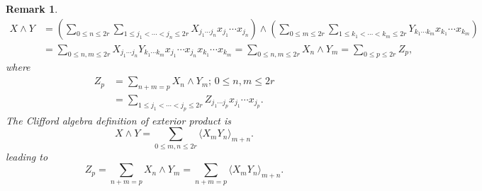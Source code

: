 \documentclass[aps, preprint]{revtex4}
\newtheorem{remark}[theorem]{Remark}
\begin{document}
\begin{remark}
\begin{align}X \wedge Y &  =\left (\sum _{0 \leq n \leq 2 r}\sum _{1 \leq j_{1} <\cdots  <j_{n} \leq 2 r}X_{j_{1} \cdots  j_{n}} x_{j_{1}} \cdots  x_{j_{n}}\right ) \wedge \left (\sum _{0 \leq m \leq 2 r}\sum _{1 \leq k_{1} <\cdots  <k_{m} \leq 2 r}Y_{k_{1} \cdots  k_{m}} x_{k_{1}} \cdots  x_{k_{m}}\right ) \\
 &  =\sum _{0 \leq n ,m \leq 2 r}X_{j_{1} \cdots  j_{n}} Y_{k_{1} \cdots  k_{m}} x_{j_{1}} \cdots  x_{j_{n}} x_{k_{1}} \cdots  x_{k_{m}} =\sum _{0 \leq n ,m \leq 2 r}X_{n} \wedge Y_{m} =\sum _{0 \leq p \leq 2 r}Z_{p}\text{,}\end{align}where
\begin{align}Z_{p} &  =\sum _{n +m =p}X_{n} \wedge Y_{m} ;\,0 \leq n ,m \leq 2 r \\
 &  =\sum _{1 \leq j_{1} <\cdots  <j_{p} \leq 2 r}Z_{j_{1} \cdots  j_{p}} x_{j_{1}} \cdots  x_{j_{p}}\text{.}\end{align}The Clifford algebra definition of exterior product is
\begin{equation}X \wedge Y =\sum _{0 \leq m ,n \leq 2 r} \langle X_{m} Y_{n} \rangle _{m +n}\text{.}
\end{equation}leading to
\begin{equation}Z_{p} =\sum _{n +m =p}X_{n} \wedge Y_{m} =\sum _{n +m =p} \langle X_{m} Y_{n} \rangle _{m +n}\text{.}
\end{equation}
\end{remark}
\end{document}
